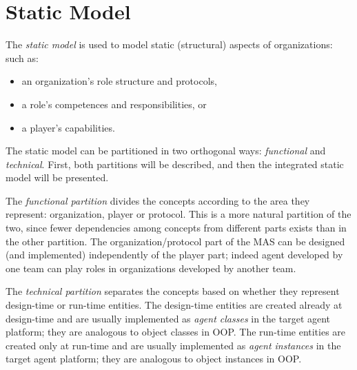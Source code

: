
\section{Static Model}

The \textit{static model} is used to model static (structural) aspects of organizations: such as:
\begin{itemize}
	\item an organization's role structure and protocols,
	\item a role's competences and responsibilities, or
	\item a player's capabilities.
\end{itemize}

The static model can be partitioned in two orthogonal ways: \textit{functional} and \textit{technical}.
First, both partitions will be described, and then the integrated static model will be presented.

The \textit{functional partition} divides the concepts according to the area they represent: organization, player or protocol.
This is a more natural partition of the two, since fewer dependencies among concepts from different parts exists than in the other partition.
The organization/protocol part of the MAS can be designed (and implemented) independently of the player part; indeed agent developed by one team can play roles in organizations developed by another team.

The \textit{technical partition} separates the concepts based on whether they represent design-time or run-time entities.
The design-time entities are created already at design-time and are usually implemented as \textit{agent classes} in the target agent platform; they are analogous to object classes in OOP.
The run-time entities are created only at run-time and are usually implemented as \textit{agent instances} in the target agent platform; they are analogous to object instances in OOP.


